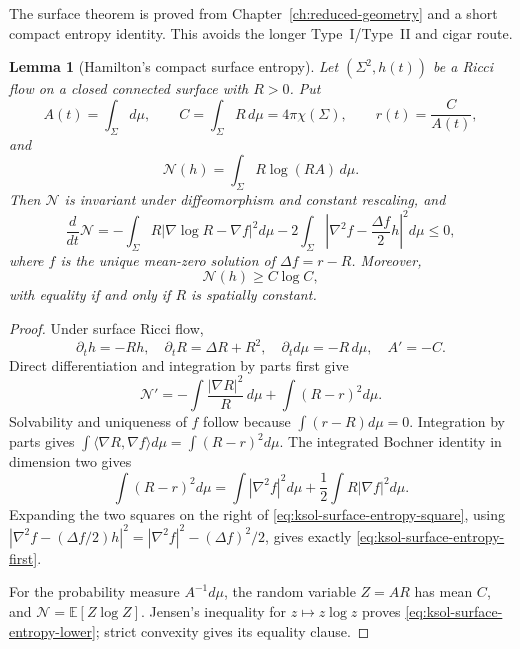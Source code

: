\documentclass[10pt]{coll-l}
\newtheorem{lemma}[theorem]{Lemma}
\theoremstyle{definition}
\theoremstyle{remark}
\numberwithin{section}{chapter}
\numberwithin{equation}{chapter}
\begin{document}
The surface theorem is proved from Chapter~\ref{ch:reduced-geometry} and a
short compact entropy identity.  This avoids the longer Type~I/Type~II and
cigar route.

\begin{lemma}[Hamilton's compact surface entropy]
\label{lem:ksol-surface-entropy}
Let $(\Sigma^2,h(t))$ be a Ricci flow on a closed connected surface with
$R>0$.  Put
\begin{equation}
 A(t)=\int_\Sigma d\mu,
 \qquad C=\int_\Sigma R\,d\mu=4\pi\chi(\Sigma),
 \qquad r(t)=\frac{C}{A(t)},                             \label{eq:ksol-surface-entropy-data}
\end{equation}
and
\begin{equation}
             \mathcal N(h)=\int_\Sigma R\log(RA)\,d\mu. \label{eq:ksol-surface-entropy}
\end{equation}
Then $\mathcal N$ is invariant under diffeomorphism and constant rescaling,
and
\begin{equation}
 \frac{d}{dt}\mathcal N
 =-\int_\Sigma R|\nabla\log R-\nabla f|^2d\mu
  -2\int_\Sigma\left|\nabla^2f-\frac{\Delta f}{2}h\right|^2d\mu\leq0,       \label{eq:ksol-surface-entropy-square}
\end{equation}
where $f$ is the unique mean-zero solution of $\Delta f=r-R$.
Moreover,
\begin{equation}
                      \mathcal N(h)\geq C\log C,        \label{eq:ksol-surface-entropy-lower}
\end{equation}
with equality if and only if $R$ is spatially constant.
\end{lemma}

\begin{proof}
Under surface Ricci flow,
\[
 \partial_t h=-Rh,\quad \partial_tR=\Delta R+R^2,
 \quad\partial_t d\mu=-R\,d\mu,\quad A'=-C.
\]
Direct differentiation and integration by parts first give
\begin{equation}
 \mathcal N'=-\int\frac{|\nabla R|^2}{R}\,d\mu
                 +\int(R-r)^2d\mu.                    \label{eq:ksol-surface-entropy-first}
\end{equation}
Solvability and uniqueness of $f$ follow because $\int(r-R)d\mu=0$.
Integration by parts gives
\(
 \int\langle\nabla R,\nabla f\rangle d\mu
       =\int(R-r)^2d\mu.
\)
The integrated Bochner identity in dimension two gives
\begin{equation}
 \int(R-r)^2d\mu
 =\int|\nabla^2f|^2d\mu+\frac12\int R|\nabla f|^2d\mu.   \label{eq:ksol-surface-Bochner}
\end{equation}
Expanding the two squares on the right of
\eqref{eq:ksol-surface-entropy-square}, using
$|\nabla^2f-(\Delta f/2)h|^2=|\nabla^2f|^2-(\Delta f)^2/2$, gives exactly
\eqref{eq:ksol-surface-entropy-first}.

For the probability measure $A^{-1}d\mu$, the random variable $Z=AR$
has mean $C$, and $\mathcal N=\mathbb E[Z\log Z]$.  Jensen's inequality for
$z\mapsto z\log z$ proves \eqref{eq:ksol-surface-entropy-lower}; strict
convexity gives its equality clause.
\end{proof}
\end{document}
